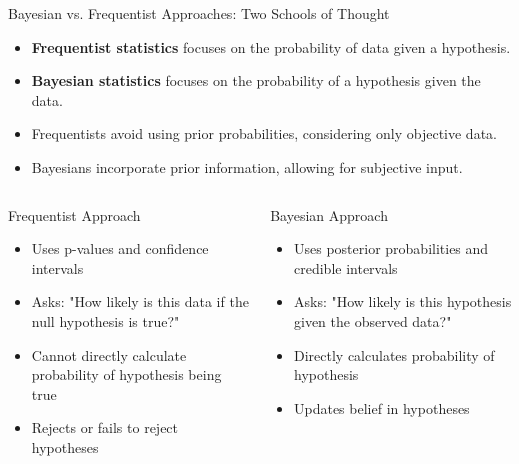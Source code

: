 \documentclass{beamer}
\begin{document}
	\begin{frame}{Bayesian vs. Frequentist Approaches: Two Schools of Thought}
		\begin{itemize}
			\item \textbf{Frequentist statistics} focuses on the probability of data given a hypothesis.
			\item \textbf{Bayesian statistics} focuses on the probability of a hypothesis given the data.
			\item Frequentists avoid using prior probabilities, considering only objective data.
			\item Bayesians incorporate prior information, allowing for subjective input.
		\end{itemize}
		
		\begin{columns}
			\begin{column}{0.48\textwidth}
				\scriptsize
				\begin{exampleblock}{Frequentist Approach}
					\begin{itemize}
						\item Uses p-values and confidence intervals
						\item Asks: "How likely is this data if the null hypothesis is true?"
						\item Cannot directly calculate probability of hypothesis being true
						\item Rejects or fails to reject hypotheses
					\end{itemize}
				\end{exampleblock}
			\end{column}
			\begin{column}{0.48\textwidth}
				\scriptsize
				\begin{exampleblock}{Bayesian Approach}
					\begin{itemize}
						\item Uses posterior probabilities and credible intervals
						\item Asks: "How likely is this hypothesis given the observed data?"
						\item Directly calculates probability of hypothesis
						\item Updates belief in hypotheses
					\end{itemize}
				\end{exampleblock}
			\end{column}
		\end{columns}
	\end{frame}
	
\end{document}
